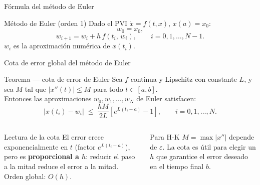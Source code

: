 \documentclass[aspectratio=169,10pt]{beamer}
\begin{document}
\begin{frame}{F\'ormula del m\'etodo de Euler}

\vspace{2pt}
\begin{defbox}{ \large M\'etodo de Euler (orden 1)}
\large Dado el PVI $\dot{x}=f(t,x)$, $x(a)=x_0$:
\[
  w_0 = x_0,
\]
\[
  w_{i+1} = w_i + h\,f(t_i,\,w_i), \qquad i = 0,1,\ldots,N-1.
\]
$w_i$ es la aproximaci\'on num\'erica de $x(t_i)$.
\end{defbox}
\end{frame}

\begin{frame}{Cota de error global del m\'etodo de Euler}
\vspace{4pt}
\begin{resultbox}{Teorema --- cota de error de Euler}
Sea $f$ continua y Lipschitz con constante $L$,
y sea $M$ tal que $|x''(t)|\leq M$ para todo $t\in[a,b]$.\\[4pt]
Entonces las aproximaciones $w_0,w_1,\ldots,w_N$ de Euler satisfacen:
\[
  |x(t_i) - w_i| \;\leq\; \frac{hM}{2L}
  \!\left[e^{L(t_i-a)} - 1\right], \qquad i=0,1,\ldots,N.
\]
\end{resultbox}

\vspace{6pt}
\begin{columns}[T]
\begin{obsbox}{Lectura de la cota}
El error crece exponencialmente en $t$
(factor $e^{L(t_i-a)}$), pero es \textbf{proporcional a $h$}:
reducir el paso a la mitad reduce el error a la mitad.\\[3pt]
Orden global: $O(h)$.
\end{obsbox}

\begin{obsbox}{Para H-K}
$M = \max|x''|$ depende de $\varepsilon$.
La cota es \'util para elegir un $h$ que garantice
el error deseado en el tiempo final $b$.
\end{obsbox}
\end{columns}
\end{frame}
\end{document}
